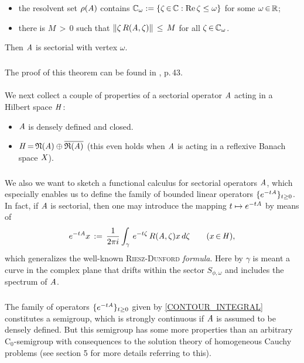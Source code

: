 \documentclass[11pt,twoside]{article}
\begin{document}
\begin{itemize}[leftmargin=4mm,itemsep=5pt]
\begin{theorem1}
\begin{itemize}[leftmargin=9mm]
\item[(a)]
the resolvent set $\rho(\mathit{A})$ contains
${\mathbb{C}}_{\omega} := \{\zeta {\,\in\,} {\mathbb{C}}: \operatorname{Re} \zeta \leq \omega\}$
for some $\omega {\,\in\,} {\mathbb{R}}$;

\item[(b)]
there is $M {\,>\,} 0$ such that
$\left\lVert \zeta \, R(\mathit{A},\zeta) \right\rVert \, \leq \, M$ for all $\zeta {\,\in\,} {\mathbb{C}}_{\omega}$.
\end{itemize}
Then $\mathit{A}$ is sectorial with vertex $\omega$.
\end{theorem1}

\subparagraph{} %
The proof of this theorem can be found in \cite{Lu}, p.\,43.

\paragraph{} %
We next collect a couple of properties of a sectorial operator $\mathit{A}$
acting in a Hilbert space $\mathit{H}$:

\begin{itemize}[leftmargin=7mm]
\item[1.]
$\mathit{A}$ is densely defined and closed.
\item[2.]
$\mathit{H} {\,=\,} \mathfrak{N}(\mathit{A}) \oplus \overline{\mathfrak{R}(\mathit{A})}$
(this even holds when $\mathit{A}$ is acting in a reflexive Banach space $\mathit{X}$).
\end{itemize}

\subparagraph{} %
We also we want to sketch a functional calculus for sectorial operators $\mathit{A}$,
which especially enables us to define the family of bounded linear operators
$\{e^{-t \mathit{A}}\}_{t \geq 0}$.
In fact,
if $\mathit{A}$ is sectorial,
then one may introduce the mapping $t \mapsto e^{-t \mathit{A}}$
by means of %
\begin{equation}\label{CONTOUR_INTEGRAL}
e^{-t \mathit{A}} x \,:=\,
\frac{1}{2 \pi i}
\int_{\gamma} \, e^{-t \zeta} \, R(\mathit{A},\zeta)x \, d\zeta
\quad \quad (x {\,\in\,} \mathit{H}),
\end{equation}
which generalizes the well-known \textsc{Riesz-Dunford} \textit{formula}.
Here by $\gamma$ is meant a curve in the complex plane
that drifts within the sector $S_{\phi,\omega}$
and includes the spectrum of $\mathit{A}$.

\subparagraph{}
The family of operators $\{e^{-t \mathit{A}} \}_{t \geq 0}$
given by \eqref{CONTOUR_INTEGRAL} constitutes a semigroup,
which is strongly continuous
if $\mathit{A}$ is assumed to be densely defined.
But this semigroup has some more properties than an arbitrary C$_0$-semigroup
with consequences to the solution theory of homogeneous Cauchy problems
(see section 5 for more details referring to this).


\end{itemize}
\end{document}
